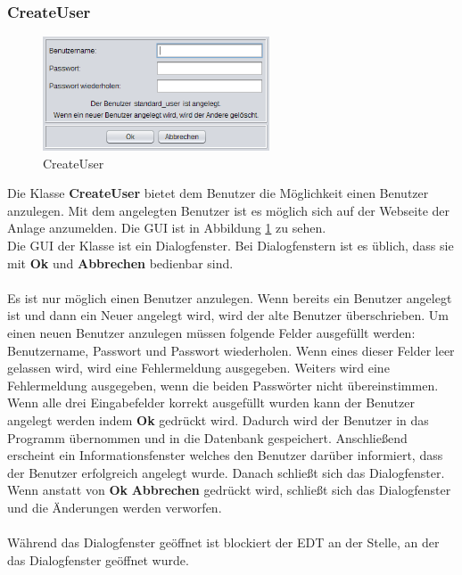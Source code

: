 \newpage

\subsubsection{CreateUser}
\begin{figure}
\vspace{-20pt}
  \begin{center}
    \includegraphics[width=0.60\textwidth]{Bilder/GUI/CreateUser}
  \end{center}
  \caption{CreateUser}
  \label{CreateUser}
  \vspace{-10pt}
\end{figure}
Die Klasse \textbf{CreateUser} bietet dem Benutzer die Möglichkeit einen Benutzer anzulegen. Mit dem angelegten Benutzer ist es möglich sich auf der Webseite der Anlage anzumelden. Die GUI ist in Abbildung \ref{CreateUser} zu sehen.
\\ Die GUI der Klasse ist ein Dialogfenster. Bei Dialogfenstern ist es üblich, dass sie mit \textbf{Ok} und \textbf{Abbrechen} bedienbar sind.
\\ \\ Es ist nur möglich einen Benutzer anzulegen. Wenn bereits ein Benutzer angelegt ist und dann ein Neuer angelegt wird, wird der alte Benutzer überschrieben. Um einen neuen Benutzer anzulegen müssen folgende Felder ausgefüllt werden: Benutzername, Passwort und Passwort wiederholen. Wenn eines dieser Felder leer gelassen wird, wird eine Fehlermeldung ausgegeben. Weiters wird eine Fehlermeldung ausgegeben, wenn die beiden Passwörter nicht übereinstimmen. Wenn alle drei Eingabefelder korrekt ausgefüllt wurden kann der Benutzer angelegt werden indem \textbf{Ok} gedrückt wird. Dadurch wird der Benutzer in das Programm übernommen und in die Datenbank gespeichert. Anschließend erscheint ein Informationsfenster welches den Benutzer darüber informiert, dass der Benutzer erfolgreich angelegt wurde. Danach schließt sich das Dialogfenster. Wenn anstatt von \textbf{Ok} \textbf{Abbrechen} gedrückt wird, schließt sich das Dialogfenster und die Änderungen werden verworfen.
\\ \\ Während das Dialogfenster geöffnet ist blockiert der EDT an der Stelle, an der das Dialogfenster geöffnet wurde.

